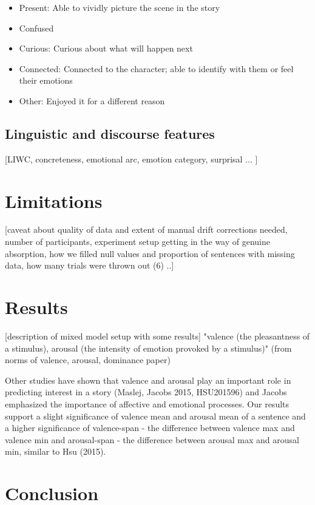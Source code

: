 \documentclass[11pt]{article}
\begin{document}
\begin{itemize}
  \item Present: Able to vividly picture the scene in the story
  \item Confused
  \item Curious: Curious about what will happen next
  \item Connected: Connected to the character; able to identify with them or feel their emotions
  \item Other: Enjoyed it for a different reason
\end{itemize}

\subsection{Linguistic and discourse features}

[LIWC, concreteness, emotional arc, emotion category, surprisal ... ]

\section{Limitations}

[caveat about quality of data and extent of manual drift corrections needed, number of participants, experiment setup getting in the way of genuine absorption, how we filled null values and proportion of sentences with missing data, how many trials were thrown out (6) ..]

\section{Results}

[description of mixed model setup with some results]
"valence (the pleasantness of a stimulus), arousal (the intensity of emotion provoked by a stimulus)" (from norms of valence, arousal, dominance paper)

Other studies have shown that valence and arousal play an important role in predicting interest in a story (Maslej, Jacobs 2015, HSU201596) and Jacobs emphasized the importance of affective and emotional processes. Our results support a slight significance of valence mean and arousal mean of a sentence and a higher significance of valence-span - the difference between valence max and valence min and arousal-span - the difference between arousal max and arousal min, similar to Hsu (2015).
\section{Conclusion}
\end{document}
